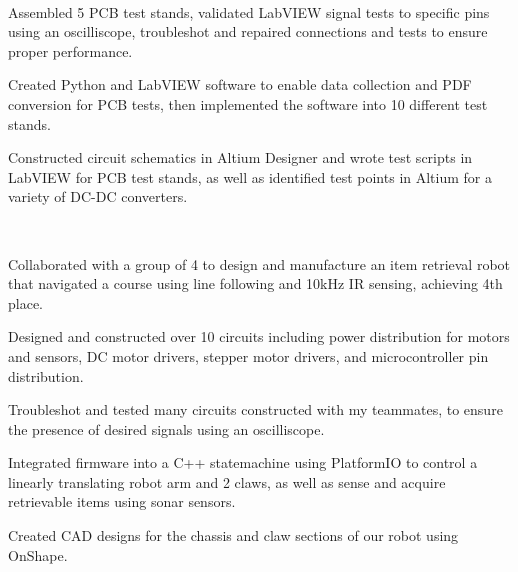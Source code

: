 \documentclass[a4paper]{MagicalCV}
\begin{document}
\begin{minipage}[t]{0.69\textwidth} 


 \\
\vspace{\topsep} %
\begin{tightemize}
\item Assembled 5 PCB test stands, validated LabVIEW signal tests to specific pins using an oscilliscope, troubleshot and repaired connections and tests to ensure proper performance.
\item Created Python and LabVIEW software to enable data collection and PDF conversion for PCB tests, then implemented the software into 10 different test stands. 
\item Constructed circuit schematics in Altium Designer and wrote test scripts in LabVIEW for PCB test stands, as well as identified test points in Altium for a variety of DC-DC converters.  
\end{tightemize}


 \\
\begin{tightemize}
    \item Collaborated with a group of 4 to design and manufacture an item retrieval robot that navigated a course using line following and 10kHz IR sensing, achieving 4th place.
    \item Designed and constructed over 10 circuits including power distribution for motors and sensors, DC motor drivers, stepper motor drivers, and microcontroller pin distribution.
    \item Troubleshot and tested many circuits constructed with my teammates, to ensure the presence of desired signals using an oscilliscope.
    \item Integrated firmware into a C++ statemachine using PlatformIO to control a linearly translating robot arm and 2 claws, as well as sense and acquire retrievable items using sonar sensors. 
    \item Created CAD designs for the chassis and claw sections of our robot using OnShape.  
\end{tightemize}
\sectionsep


\end{minipage}
\end{document}
